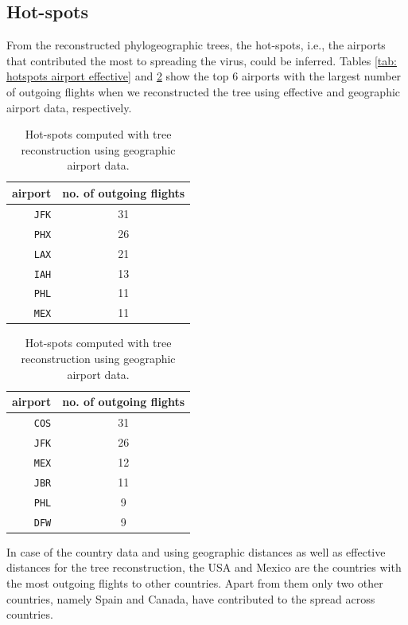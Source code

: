 \documentclass{article}
\begin{document}
\subsection{Hot-spots}
From the reconstructed phylogeographic trees, the hot-spots, i.e., the airports
that contributed the most to spreading the virus, could be inferred. Tables
\ref{tab: hotspots airport effective} and \ref{tab: hotspots airport geographic}
show the top 6 airports with the largest number of outgoing flights when we
reconstructed the tree using effective and geographic airport data,
respectively.

\begin{table}[h!]
\centering
\parbox{.45\linewidth}{
\centering
\begin{tabular}{r|c}
airport & no. of outgoing flights \\
\hline
\texttt{JFK}      & 31                      \\
\texttt{PHX}      & 26                      \\
\texttt{LAX}      & 21                      \\
\texttt{IAH}      & 13                      \\
\texttt{PHL}      & 11                      \\
\texttt{MEX}      & 11                                     
\end{tabular}
\caption{Hot-spots computed with tree reconstruction using effective airport data.}
\label{tab: hotspots airport effective}
}
\qquad
\parbox{.45\linewidth}{
\centering
\begin{tabular}{r|c}
airport & no. of outgoing flights \\
\hline
\texttt{COS}      & 31                      \\
\texttt{JFK}      & 26                      \\
\texttt{MEX}      & 12                      \\
\texttt{JBR}      & 11                      \\
\texttt{PHL}      & 9                       \\
\texttt{DFW}      & 9                                
\end{tabular}
\caption{Hot-spots computed with tree reconstruction using geographic airport data.}
\label{tab: hotspots airport geographic}
}
\end{table}

In case of the country data and using geographic distances as well as effective
distances for the tree reconstruction, the USA and Mexico are the countries with
the most outgoing flights to other countries. Apart from them only two other
countries, namely Spain and Canada, have contributed to the spread across
countries.
\end{document}
